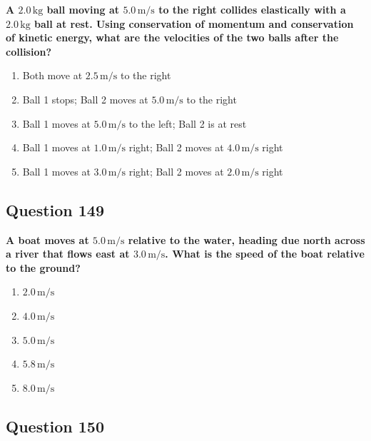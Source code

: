 \documentclass[12pt,letterpaper]{article}
\begin{document}
\begin{questionbox}
\textbf{A $2.0\,\text{kg}$ ball moving at $5.0\,\text{m/s}$ to the right collides elastically with a $2.0\,\text{kg}$ ball at rest. Using conservation of momentum and conservation of kinetic energy, what are the velocities of the two balls after the collision?}

\begin{enumerate}[label=\alph*)]
    \item Both move at $2.5\,\text{m/s}$ to the right
    \item Ball 1 stops; Ball 2 moves at $5.0\,\text{m/s}$ to the right
    \item Ball 1 moves at $5.0\,\text{m/s}$ to the left; Ball 2 is at rest
    \item Ball 1 moves at $1.0\,\text{m/s}$ right; Ball 2 moves at $4.0\,\text{m/s}$ right
    \item Ball 1 moves at $3.0\,\text{m/s}$ right; Ball 2 moves at $2.0\,\text{m/s}$ right
\end{enumerate}
\end{questionbox}

\subsection{Question 149}

\begin{questionbox}
\textbf{A boat moves at $5.0\,\text{m/s}$ relative to the water, heading due north across a river that flows east at $3.0\,\text{m/s}$. What is the speed of the boat relative to the ground?}

\begin{enumerate}[label=\alph*)]
    \item $2.0\,\text{m/s}$
    \item $4.0\,\text{m/s}$
    \item $5.0\,\text{m/s}$
    \item $5.8\,\text{m/s}$
    \item $8.0\,\text{m/s}$
\end{enumerate}
\end{questionbox}

\subsection{Question 150}
\end{document}
